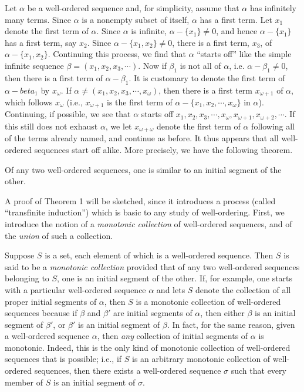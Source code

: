 \documentclass{article}
\newcounter{theoremcount}
\newenvironment{theorem}
{ \begin{description} \refstepcounter{theoremcount} \item[Theorem \arabic{theoremcount}:] }
{ \end{description} }
\begin{document}
Let $\alpha$ be a well-ordered sequence and, for simplicity, assume that $\alpha$ has infinitely many terms. Since $\alpha$ is a nonempty subset of itself, $\alpha$ has a first term. Let $x_1$ denote the first term of $\alpha$. Since $\alpha$ is infinite, $\alpha - \{ x_1 \} \neq 0$, and hence $\alpha - \{ x_1 \}$ has a first term, say $x_2$. Since $\alpha - \{ x_1, x_2 \} \neq 0$, there is a first term, $x_3$, of $\alpha - \{ x_1, x_2 \}$. Continuing this process, we find that $\alpha$ ``starts off'' like the simple infinite sequence $\beta = (x_1, x_2, x_3, \cdots)$. Now if $\beta_1$ is not all of $\alpha$, i.e. $\alpha - \beta_{1} \neq 0$, then there is a first term of $\alpha - \beta_1$. It is customary to denote the first term of $\alpha - beta_1$ by $x_\omega$. If $\alpha \neq (x_1, x_2, x_3, \cdots, x_\omega)$, then there is a first term $x_{\omega+1}$ of $\alpha$, which follows $x_\omega$ (i.e., $x_{\omega+1}$ is the first term of $\alpha - \{ x_1, x_2, \cdots, x_{\omega} \}$ in $\alpha$). Continuing, if possible, we see that $\alpha$ starts off $x_1, x_2, x_3, \cdots, x_{\omega}, x_{\omega+1}, x_{\omega+2}, \cdots$. If this still does not exhaust $\alpha$, we let $x_{\omega+\omega}$ denote the first term of $\alpha$ following all of the terms already named, and continue as before. It thus appears that all well-ordered sequences start off alike. More precisely, we have the following theorem.

\begin{theorem} %
Of any two well-ordered sequences, one is similar to an initial segment of the other.
\end{theorem}

A proof of Theorem 1 will be sketched, since it introduces a process (called ``transfinite induction'') which is basic to any study of well-ordering. First, we introduce the notion of a \emph{monotonic collection} of well-ordered sequences, and of the \emph{union} of such a collection.

Suppose $S$ is a set, each element of which is a well-ordered sequence. Then $S$ is said to be a \emph{monotonic collection} provided that of any two well-ordered sequences belonging to $S$, one is an initial segment of the other. If, for example, one starts with a particular well-ordered sequence $\alpha$ and lets $S$ denote the collection of all proper initial segments of $\alpha$, then $S$ is a monotonic collection of well-ordered sequences because if $\beta$ and $\beta'$ are initial segments of $\alpha$, then either $\beta$ is an initial segment of $\beta'$, or $\beta'$ is an initial segment of $\beta$. In fact, for the same reason, given a well-ordered sequence $\alpha$, then \emph{any} collection of initial segments of $\alpha$ is monotonic. Indeed, this is the only kind of monotonic collection of well-ordered sequences that is possible; i.e., if $S$ is an arbitrary monotonic collection of well-ordered sequences, then there exists a well-ordered sequence $\sigma$ such that every member of $S$ is an initial segment of $\sigma$. 
\end{document}
